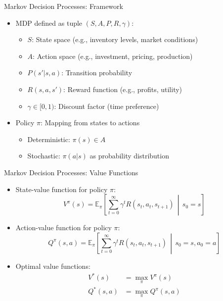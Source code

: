 \documentclass[10pt]{beamer}
\newcommand{\E}{\mathbb{E}}
\DeclareMathOperator*{\maxop}{max} %
\begin{document}
\begin{frame}{Markov Decision Processes: Framework}
    \begin{itemize}
        \item MDP defined as tuple $(S, A, P, R, \gamma)$:
        \begin{itemize}
            \item $S$: State space (e.g., inventory levels, market conditions)
            \item $A$: Action space (e.g., investment, pricing, production)
            \item $P(s'|s,a)$: Transition probability
            \item $R(s,a,s')$: Reward function (e.g., profits, utility)
            \item $\gamma \in [0,1)$: Discount factor (time preference)
        \end{itemize}
        \vspace{0.2cm}
        \item Policy $\pi$: Mapping from states to actions
        \begin{itemize}
            \item Deterministic: $\pi(s) \in A$
            \item Stochastic: $\pi(a|s)$ as probability distribution
        \end{itemize}
    \end{itemize}
\end{frame}


\begin{frame}{Markov Decision Processes: Value Functions}
    \begin{itemize}
        \item State-value function for policy $\pi$:
        \begin{equation}
            V^{\pi}(s) = \E_{\pi}\left[\sum_{t=0}^{\infty} \gamma^t R(s_t, a_t, s_{t+1}) \,\middle|\, s_0 = s\right]
        \end{equation}

        \item Action-value function for policy $\pi$:
        \begin{equation}
            Q^{\pi}(s,a) = \E_{\pi}\left[\sum_{t=0}^{\infty} \gamma^t R(s_t, a_t, s_{t+1}) \,\middle|\, s_0 = s, a_0 = a\right]
        \end{equation}

        \item Optimal value functions:
        \begin{align}
            V^*(s) &= \maxop_{\pi} V^{\pi}(s) \\
            Q^*(s,a) &= \maxop_{\pi} Q^{\pi}(s,a)
        \end{align}
    \end{itemize}
\end{frame}
\end{document}

